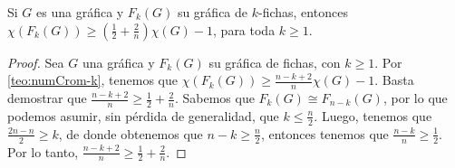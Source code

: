 \begin{teorema}
\label{teo:numCrom indep-k}
    Si $G$ es una gr\'afica y $F_k(G)$ su gr\'afica de $k$-fichas, entonces
    $\chi (F_k(G)) \geq (\frac{1}{2}+ \frac{2}{n})\chi(G) -1 $, para toda $k
    \geq 1$.
\end{teorema}
    
\begin{proof}
    Sea $G$ una gr\'afica y $F_k(G)$ su gr\'afica de fichas, con $k \geq 1$. Por
    \cref{teo:numCrom-k}, tenemos que $\chi(F_k(G)) \geq \frac{n-k+2}{n} \chi(G)
    -1$. Basta demostrar que $\frac{n-k+2}{n} \geq \frac{1}{2}+\frac{2}{n}$.
    Sabemos que $F_k(G) \cong F_{n-k}(G)$, por lo que podemos asumir, sin
    p\'erdida de generalidad, que $k\leq \frac{n}{2}$. Luego, tenemos que
    $\frac{2n-n}{2}\geq k$, de donde obtenemos que $n-k \geq \frac{n}{2}$,
    entonces tenemos que $\frac{n-k}{n}\geq \frac{1}{2}$. Por lo tanto,
    $\frac{n-k+2}{n} \geq \frac{1}{2}+\frac{2}{n}$.
\end{proof}